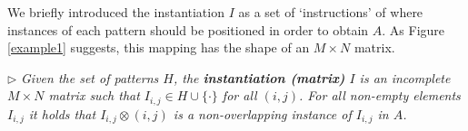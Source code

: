 \documentclass{llncs}
\begin{document}
We briefly introduced the instantiation $I$ as a set of `instructions' of where instances of each pattern should be positioned in order to obtain $A$. As Figure \ref{example1} suggests, this mapping has the shape of an $M\times N$ matrix.

\smallskip
\noindent $\triangleright$
\emph{Given the set of patterns $H$, the \textbf{instantiation (matrix)} ${I}$ is an incomplete $M\times N$ matrix such that ${I}_{i,j} \in H \cup \{\cdot\}$ for all $(i,j)$. For all non-empty elements ${I}_{i,j}$ it holds that ${I}_{i,j} \otimes (i,j)$ is a non-overlapping instance of ${I}_{i,j}$ in $A$.}
\smallskip

\end{document}
